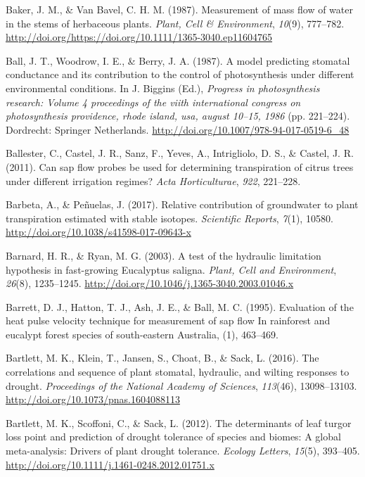 \documentclass[11pt,twoside]{reedthesis}
\begin{document}
\hypertarget{ref-Baker1987}{}
Baker, J. M., \& Van Bavel, C. H. M. (1987). Measurement of mass flow of
water in the stems of herbaceous plants. \emph{Plant, Cell \&
Environment}, \emph{10}(9), 777--782.
\url{http://doi.org/https://doi.org/10.1111/1365-3040.ep11604765}

\hypertarget{ref-Ball1987}{}
Ball, J. T., Woodrow, I. E., \& Berry, J. A. (1987). A model predicting
stomatal conductance and its contribution to the control of
photosynthesis under different environmental conditions. In J. Biggins
(Ed.), \emph{Progress in photosynthesis research: Volume 4 proceedings
of the viith international congress on photosynthesis providence, rhode
island, usa, august 10--15, 1986} (pp. 221--224). Dordrecht: Springer
Netherlands. \url{http://doi.org/10.1007/978-94-017-0519-6_48}

\hypertarget{ref-Ballester2011}{}
Ballester, C., Castel, J. R., Sanz, F., Yeves, A., Intrigliolo, D. S.,
\& Castel, J. R. (2011). Can sap flow probes be used for determining
transpiration of citrus trees under different irrigation regimes?
\emph{Acta Horticulturae}, \emph{922}, 221--228.

\hypertarget{ref-barbeta_relative_2017}{}
Barbeta, A., \& Peñuelas, J. (2017). Relative contribution of
groundwater to plant transpiration estimated with stable isotopes.
\emph{Scientific Reports}, \emph{7}(1), 10580.
\url{http://doi.org/10.1038/s41598-017-09643-x}

\hypertarget{ref-barnard_test_2003}{}
Barnard, H. R., \& Ryan, M. G. (2003). A test of the hydraulic
limitation hypothesis in fast-growing Eucalyptus saligna. \emph{Plant,
Cell and Environment}, \emph{26}(8), 1235--1245.
\url{http://doi.org/10.1046/j.1365-3040.2003.01046.x}

\hypertarget{ref-Barrett1995}{}
Barrett, D. J., Hatton, T. J., Ash, J. E., \& Ball, M. C. (1995).
Evaluation of the heat pulse velocity technique for measurement of sap
flow In rainforest and eucalypt forest species of south-eastern
Australia, (1), 463--469.

\hypertarget{ref-bartlett_correlations_2016}{}
Bartlett, M. K., Klein, T., Jansen, S., Choat, B., \& Sack, L. (2016).
The correlations and sequence of plant stomatal, hydraulic, and wilting
responses to drought. \emph{Proceedings of the National Academy of
Sciences}, \emph{113}(46), 13098--13103.
\url{http://doi.org/10.1073/pnas.1604088113}

\hypertarget{ref-bartlett_determinants_2012}{}
Bartlett, M. K., Scoffoni, C., \& Sack, L. (2012). The determinants of
leaf turgor loss point and prediction of drought tolerance of species
and biomes: A global meta-analysis: Drivers of plant drought tolerance.
\emph{Ecology Letters}, \emph{15}(5), 393--405.
\url{http://doi.org/10.1111/j.1461-0248.2012.01751.x}
\end{document}
